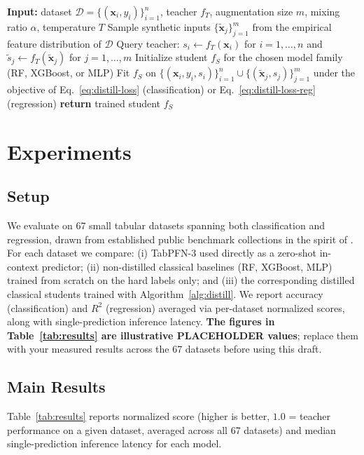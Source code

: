 \documentclass[10pt]{article}
\begin{document}
\begin{algorithm}[t]
\caption{TabPFN-3 distillation into a classical student}
\label{alg:distill}
\begin{algorithmic}[1]
\STATE \textbf{Input:} dataset $\mathcal{D} = \{(\mathbf{x}_i,y_i)\}_{i=1}^n$, teacher $f_T$, augmentation size $m$, mixing ratio $\alpha$, temperature $T$
\STATE Sample synthetic inputs $\{\tilde{\mathbf{x}}_j\}_{j=1}^m$ from the empirical feature distribution of $\mathcal{D}$
\STATE Query teacher: $s_i \leftarrow f_T(\mathbf{x}_i)$ for $i=1,\dots,n$ and $\tilde{s}_j \leftarrow f_T(\tilde{\mathbf{x}}_j)$ for $j=1,\dots,m$
\STATE Initialize student $f_S$ for the chosen model family (RF, XGBoost, or MLP)
\STATE Fit $f_S$ on $\{(\mathbf{x}_i, y_i, s_i)\}_{i=1}^n \cup \{(\tilde{\mathbf{x}}_j, s_j)\}_{j=1}^m$ under the objective of Eq.~\eqref{eq:distill-loss} (classification) or Eq.~\eqref{eq:distill-loss-reg} (regression)
\STATE \textbf{return} trained student $f_S$
\end{algorithmic}
\end{algorithm}

\section{Experiments}
\label{sec:experiments}

\subsection{Setup}
We evaluate on 67 small tabular datasets spanning both classification
and regression, drawn from established public benchmark collections
in the spirit of \citet{grinsztajn2022tree}. For each dataset we
compare: (i) TabPFN-3 used directly as a zero-shot in-context
predictor; (ii) non-distilled classical baselines (RF, XGBoost, MLP)
trained from scratch on the hard labels only; and (iii) the
corresponding distilled classical students trained with
Algorithm~\ref{alg:distill}. We report accuracy (classification) and
$R^2$ (regression) averaged via per-dataset normalized scores, along
with single-prediction inference latency. \textbf{The figures in
Table~\ref{tab:results} are illustrative PLACEHOLDER values}; replace
them with your measured results across the 67 datasets before using
this draft.

\subsection{Main Results}
Table~\ref{tab:results} reports normalized score (higher is better,
$1.0$ = teacher performance on a given dataset, averaged across all 67
datasets) and median single-prediction inference latency for each
model.
\end{document}
